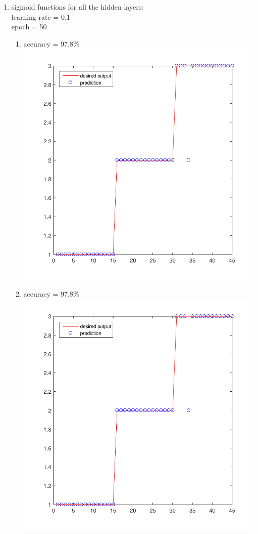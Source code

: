 \documentclass[12pt,a4paper]{article}
\begin{document}
\begin{CJK}{UTF8}{bsmi}
\begin{enumerate}
\begin{enumerate}
\begin{enumerate}
\begin{enumerate}
\newpage	
		\end{enumerate}
	\item sigmoid functions for all the hidden layers:
	\\
	learning rate = 0.1 \\
	epoch = 50
	\begin{enumerate}
		\item accuracy = 97.8\%\ \\
		\includegraphics[scale=0.6]{irisss1}
		\newpage	
		\item accuracy = 97.8\%\ \\
		\includegraphics[scale=0.6]{irisss1}	

\end{enumerate}
\end{enumerate}
\end{enumerate}
\end{enumerate}
\end{CJK}
\end{document}
